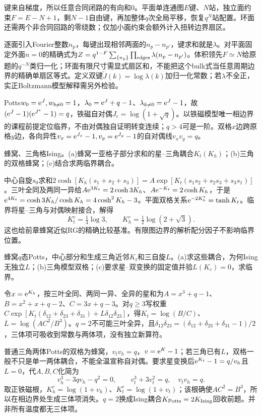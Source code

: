 \begin{solution}
键来自梯度，所以任意合同闭路的有向和0。平面单连通图$E$键、$N$站，独立面约束$F=E-N+1$，剩$N-1$自由键，再加整体$q$次全局平移，恢复$q^N$站配置。环面还需两个非合同回路的零绕数；仅加小面约束会额外计入扭转边界扇区。

逐面引入Fourier整数$n_p$，每键出现相邻两面的$n_p-n_{p'}$，键求和就是$\lambda$。对平面固定外面$n=0$的精确式为$Z=q^{1-F}\sum_{\{n_p\}}\prod_{\rm edges}\lambda(n_p-n_{p'})$。体积领先$F\simeq N$给原题的$q^{-N}$类归一化；环面有限尺寸需显式扇区和，不能把这个bulk式当任意周期边界的精确单扇区等式。定义双键$\widetilde J(k)=\log\lambda(k)$加归一化常数；若$\lambda$不全正，实正Boltzmann模型解释需另外检验。

Potts$w_0=\mathrm e^J,w_{b\ne0}=1$，$\lambda_0=\mathrm e^J+q-1$、$\lambda_{k\ne0}=\mathrm e^J-1$，故$(\mathrm e^J-1)(\mathrm e^{J^*}-1)=q$，铁磁自对偶$J_c=\log(1+\sqrt q)$。以铁磁模型唯一相边界的课程前提定位临界，不由对偶独自证明转变连续；$q>4$可是一阶。双格$x$边跨原格$y$边，各向异性$v_x=\mathrm e^{J_x}-1,v_y=\mathrm e^{J_y}-1$的自对偶线$v_xv_y=q$。
\end{solution}
\begin{exercise}[原题4(a)--(c)]\label{p:334-5-4}
蜂窝、三角格Ising。(a)蜂窝一亚格子部分求和的星--三角耦合$K_t(K_h)$；(b)三角的双格蜂窝；(c)结合求两临界耦合。
\end{exercise}
\begin{solution}
中心自旋$s_0$求和$2\cosh[K_h(s_1+s_2+s_3)]=A\exp[K_t(s_1s_2+s_2s_3+s_3s_1)]$。三叶全同及两同一异给$A\mathrm e^{3K_t}=2\cosh3K_h$、$A\mathrm e^{-K_t}=2\cosh K_h$，于是$\mathrm e^{4K_t}=\cosh3K_h/\cosh K_h=4\cosh^2K_h-3$。平面双格关系$\mathrm e^{-2K_h^*}=\tanh K_t$。临界将星--三角与对偶映射接合，解得
\begin{equation}
K_t^c=\tfrac14\log3,\qquad K_h^c=\tfrac12\log(2+\sqrt3).
\end{equation}
这也给前章蜂窝近似RG的精确比较基准。有限图边界的解析配分因子不影响临界位置。
\end{solution}
\begin{exercise}[原题5(a)--(c)，(c)选做]\label{p:334-5-5}
蜂窝$q$态Potts，中心部分和生成三角近邻$K_t$和三自旋$L$。(a)求这些耦合，为何Ising无独立$L$；(b)三角模型双格；(c)要求星--双变换的固定值并验$L(K_c)=0$，求临界。
\end{exercise}
\begin{solution}
令$x=\mathrm e^{K_h}$，按三叶全同、两同一异、全异的星和为$A=x^3+q-1$、$B=x^2+x+q-2$、$C=3x+q-3$。对$q\ge3$写权重$C\exp[K_t(\delta_{12}+\delta_{23}+\delta_{31})+L\delta_{12}\delta_{23}]$，得$K_t=\log(B/C)$、$L=\log(AC^2/B^3)$。$q=2$不可能三叶全异，且$\delta_{12}\delta_{23}=(\delta_{12}+\delta_{23}+\delta_{31}-1)/2$，三体项可吸收到常数与两体项，没有独立新算符。

普通三角两体Potts的双格为蜂窝，$v_tv_h=q$，$v=\mathrm e^K-1$；若三角已有$L$，双格一般不只是单一两体耦合，不能全温宣称自对偶。要求星变换后$\mathrm e^{K_t}-1=q/v_h$且$L=0$，代$A,B,C$化简为
\begin{equation}
v_h^3-3qv_h-q^2=0,\qquad v_t^3+3v_t^2=q,\quad v_tv_h=q.
\end{equation}
取正铁磁根，$K_h^c=\log(1+v_h)$、$K_t^c=\log(1+v_t)$；该根确使$AC^2=B^3$，所以在相边界处生成三体项消失。$q=2$换成Ising耦合$K_{\rm Potts}=2K_{\rm Ising}$回收前题。并非所有温度都无三体项。
\end{solution}
